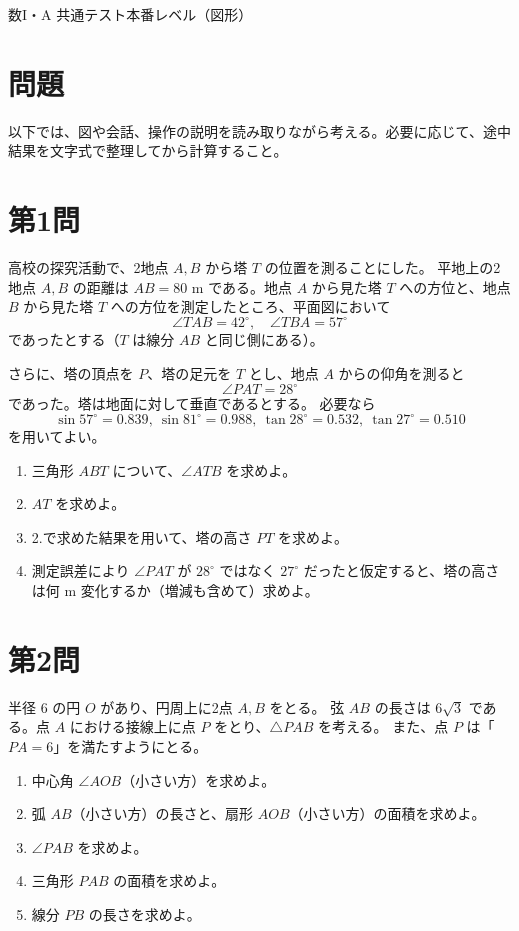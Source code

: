 \documentclass[a4paper,12pt]{jsarticle}
\begin{document}
\begin{center}
{\LARGE 数I・A 共通テスト本番レベル（図形）}
\end{center}

\vspace{1em}

\section*{問題}

以下では、図や会話、操作の説明を読み取りながら考える。必要に応じて、途中結果を文字式で整理してから計算すること。

\section*{第1問}
高校の探究活動で、2地点 $A,B$ から塔 $T$ の位置を測ることにした。  
平地上の2地点 $A,B$ の距離は $AB=80\text{ m}$ である。地点 $A$ から見た塔 $T$ への方位と、地点 $B$ から見た塔 $T$ への方位を測定したところ、平面図において
\[
\angle TAB=42^\circ,\quad \angle TBA=57^\circ
\]
であったとする（$T$ は線分 $AB$ と同じ側にある）。

さらに、塔の頂点を $P$、塔の足元を $T$ とし、地点 $A$ からの仰角を測ると
\[
\angle PAT=28^\circ
\]
であった。塔は地面に対して垂直であるとする。
必要なら
\[
\sin57^\circ=0.839,\ \sin81^\circ=0.988,\ \tan28^\circ=0.532,\ \tan27^\circ=0.510
\]
を用いてよい。

\begin{enumerate}[label=\arabic*.]
  \item 三角形 $ABT$ について、$\angle ATB$ を求めよ。
  \item $AT$ を求めよ。
  \item 2.で求めた結果を用いて、塔の高さ $PT$ を求めよ。
  \item 測定誤差により $\angle PAT$ が $28^\circ$ ではなく $27^\circ$ だったと仮定すると、塔の高さは何 m 変化するか（増減も含めて）求めよ。
\end{enumerate}

\section*{第2問}
半径 $6$ の円 $O$ があり、円周上に2点 $A,B$ をとる。  
弦 $AB$ の長さは $6\sqrt3$ である。点 $A$ における接線上に点 $P$ をとり、$\triangle PAB$ を考える。  
また、点 $P$ は「$PA=6$」を満たすようにとる。

\begin{enumerate}[label=\arabic*.]
  \item 中心角 $\angle AOB$（小さい方）を求めよ。
  \item 弧 $AB$（小さい方）の長さと、扇形 $AOB$（小さい方）の面積を求めよ。
  \item $\angle PAB$ を求めよ。
  \item 三角形 $PAB$ の面積を求めよ。
  \item 線分 $PB$ の長さを求めよ。
\end{enumerate}
\end{document}
